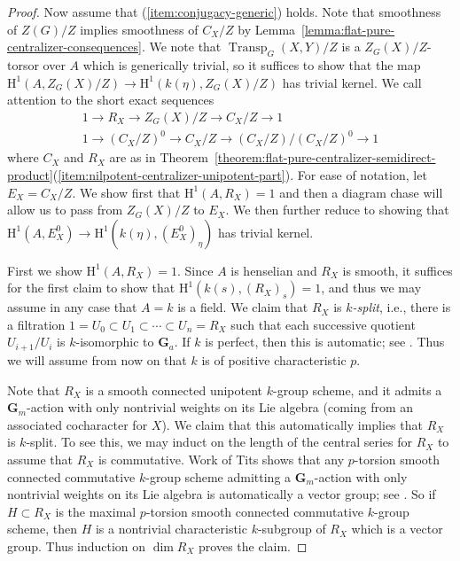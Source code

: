 \documentclass[11pt,reqno]{amsart}
\theoremstyle{definition}
\renewcommand{\rm}{\mathrm}
\newcommand{\bG}{{\mathbf G}}
\DeclareMathOperator{\Transp}{Transp}
\begin{document}
\begin{proof}
Now assume that (\ref{item:conjugacy-generic}) holds. Note that smoothness of $Z(G)/Z$ implies smoothness of $C_X/Z$ by Lemma~\ref{lemma:flat-pure-centralizer-consequences}. We note that $\Transp_G(X, Y)/Z$ is a $Z_G(X)/Z$-torsor over $A$ which is generically trivial, so it suffices to show that the map $\rm{H}^1(A, Z_G(X)/Z) \to \rm{H}^1(k(\eta), Z_G(X)/Z)$ has trivial kernel. We call attention to the short exact sequences
\begin{gather*}
1 \to R_X \to Z_G(X)/Z \to C_X/Z \to 1 \\
1 \to (C_X/Z)^0 \to C_X/Z \to (C_X/Z)/(C_X/Z)^0 \to 1
\end{gather*}
where $C_X$ and $R_X$ are as in Theorem~\ref{theorem:flat-pure-centralizer-semidirect-product}(\ref{item:nilpotent-centralizer-unipotent-part}). For ease of notation, let $E_X = C_X/Z$. We show first that $\rm{H}^1(A, R_X) = 1$ and then a diagram chase will allow us to pass from $Z_G(X)/Z$ to $E_X$. We then further reduce to showing that $\rm{H}^1(A, E_X^0) \to \rm{H}^1(k(\eta), (E_X^0)_\eta)$ has trivial kernel. \smallskip

First we show $\rm{H}^1(A, R_X) = 1$. Since $A$ is henselian and $R_X$ is smooth, it suffices for the first claim to show that $\rm{H}^1(k(s), (R_X)_s) = 1$, and thus we may assume in any case that $A = k$ is a field. We claim that $R_X$ is $k$\textit{-split}, i.e., there is a filtration $1 = U_0 \subset U_1 \subset \cdots \subset U_n = R_X$ such that each successive quotient $U_{i+1}/U_i$ is $k$-isomorphic to $\bG_a$. If $k$ is perfect, then this is automatic; see \cite[Cor.\ 15.5]{Borel}. Thus we will assume from now on that $k$ is of positive characteristic $p$. \smallskip

Note that $R_X$ is a smooth connected unipotent $k$-group scheme, and it admits a $\bG_m$-action with only nontrivial weights on its Lie algebra (coming from an associated cocharacter for $X$). We claim that this automatically implies that $R_X$ is $k$-split. To see this, we may induct on the length of the central series for $R_X$ to assume that $R_X$ is commutative. Work of Tits shows that any $p$-torsion smooth connected commutative $k$-group scheme admitting a $\bG_m$-action with only nontrivial weights on its Lie algebra is automatically a vector group; see \cite[Thm.\ B.4.3]{CGP}. So if $H \subset R_X$ is the maximal $p$-torsion smooth connected commutative $k$-group scheme, then $H$ is a nontrivial characteristic $k$-subgroup of $R_X$ which is a vector group. Thus induction on $\dim R_X$ proves the claim. \smallskip


\end{proof}
\end{document}
